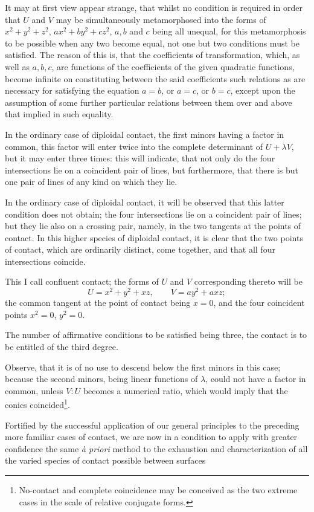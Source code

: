 \documentclass[11pt]{article}
\newcommand{\sourcepage}[1]{\marginpar{\scriptsize p.~#1}}
\begin{document}
{{\sourcepage{226}
It may at first view appear strange, that whilst no condition is required in order that $U$ and $V$ may be simultaneously metamorphosed into the forms of $x^2+y^2+z^2$, $ax^2+by^2+cz^2$, $a,b$ and $c$ being all unequal, for this metamorphosis to be possible when any two become equal, not one but two conditions must be satisfied. The reason of this is, that the coefficients of transformation, which, as well as $a,b,c$, are functions of the coefficients of the given quadratic functions, become infinite on constituting between the said coefficients such relations as are necessary for satisfying the equation $a=b$, or $a=c$, or $b=c$, except upon the assumption of some further particular relations between them over and above that implied in such equality.

In the ordinary case of diploidal contact, the first minors having a factor in common, this factor will enter twice into the complete determinant of $U+\lambda V$, but it may enter three times: this will indicate, that not only do the four intersections lie on a coincident pair of lines, but furthermore, that there is but one pair of lines of any kind on which they lie.

In the ordinary case of diploidal contact, it will be observed that this latter condition does not obtain; the four intersections lie on a coincident pair of lines; but they lie also on a crossing pair, namely, in the two tangents at the points of contact. In this higher species of diploidal contact, it is clear that the two points of contact, which are ordinarily distinct, come together, and that all four intersections coincide.

This I call confluent contact; the forms of $U$ and $V$ corresponding thereto will be
\[
U=x^2+y^2+xz,
\qquad
V=ay^2+axz;
\]
the common tangent at the point of contact being $x=0$, and the four coincident points $x^2=0$, $y^2=0$.

The number of affirmative conditions to be satisfied being three, the contact is to be entitled of the third degree.

Observe, that it is of no use to descend below the first minors in this case; because the second minors, being linear functions of $\lambda$, could not have a factor in common, unless $V:U$ becomes a numerical ratio, which would imply that the conics coincided\footnote{No-contact and complete coincidence may be conceived as the two extreme cases in the scale of relative conjugate forms.}.

Fortified by the successful application of our general principles to the preceding more familiar cases of contact, we are now in a condition to apply with greater confidence the same \emph{à priori} method to the exhaustion and characterization of all the varied species of contact possible between surfaces

}}
\end{document}
